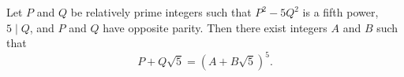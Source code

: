 Let $P$ and $Q$ be relatively prime integers such that $P^2 - 5Q^2$ is a fifth power, $5 \mid Q$, and $P$ and $Q$ have opposite parity. Then there exist integers $A$ and $B$ such that
$$P + Q\sqrt{5} = (A + B\sqrt{5})^5.$$
